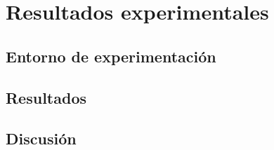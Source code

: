 
\chapter{Resultados experimentales}

\section{Entorno de experimentación}
\section{Resultados}
\section{Discusión}

\endinput
